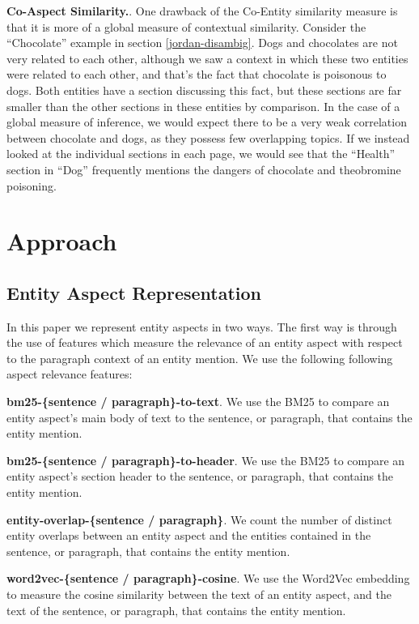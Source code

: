 \documentclass[sigconf,authordraft]{acmart}
\begin{document}
\textbf{Co-Aspect Similarity.}. One drawback of the Co-Entity similarity measure is that it is more of a global measure of contextual similarity. Consider the ``Chocolate'' example in section \ref{jordan-disambig}. Dogs and chocolates are not very related to each other, although we saw a context in which these two entities were related to each other, and that's the fact that chocolate is poisonous to dogs. Both entities have a section discussing this fact, but these sections are far smaller than the other sections in these entities by comparison. In the case of a global measure of inference, we would expect there to be a very weak correlation between chocolate and dogs, as they possess few overlapping topics. If we instead looked at the individual sections in each page, we would see that the ``Health'' section in ``Dog'' frequently mentions the dangers of chocolate and theobromine poisoning. 

\section{Approach}


\subsection{Entity Aspect Representation}\label{jordan-vector}
In this paper we represent entity aspects in two ways.
The first way is through the use of features which measure the relevance of an entity aspect with respect to the paragraph context of an entity mention. We use the following following aspect relevance features:

\textbf{bm25-\{sentence / paragraph\}-to-text}. We use the BM25 to compare an entity aspect's main body of text to the sentence, or paragraph, that contains the entity mention. 

\textbf{bm25-\{sentence / paragraph\}-to-header}. We use the BM25 to compare an entity aspect's section header to the sentence, or paragraph, that contains the entity mention. 


\textbf{entity-overlap-\{sentence / paragraph\}}. We count the number of distinct entity overlaps between an entity aspect and the entities contained in the sentence, or paragraph, that contains the entity mention.

\textbf{word2vec-\{sentence / paragraph\}-cosine}. We use the Word2Vec embedding to measure the cosine similarity between the text of an entity aspect, and the text of the sentence, or paragraph, that contains the entity mention.
\end{document}
